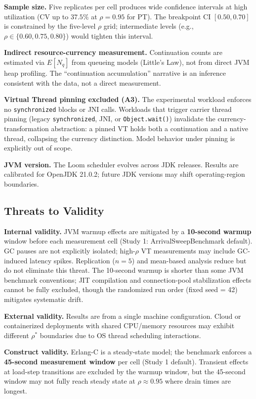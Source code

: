 \documentclass[10pt]{article}
\begin{document}
\textbf{Sample size.} Five replicates per cell produces wide confidence intervals at high utilization (CV up to $37.5\%$ at $\rho = 0.95$ for PT). The breakpoint CI $[0.50, 0.70]$ is constrained by the five-level $\rho$ grid; intermediate levels (e.g., $\rho \in \{0.60, 0.75, 0.80\}$) would tighten this interval.

\textbf{Indirect resource-currency measurement.} Continuation counts are estimated via $E[N_q]$ from queueing models (Little's Law), not from direct JVM heap profiling. The ``continuation accumulation'' narrative is an inference consistent with the data, not a direct measurement.

\textbf{Virtual Thread pinning excluded (A3).} The experimental workload enforces no \texttt{synchronized} blocks or JNI calls. Workloads that trigger carrier thread pinning (legacy \texttt{synchronized}, JNI, or \texttt{Object.wait()}) invalidate the currency-transformation abstraction: a pinned VT holds both a continuation and a native thread, collapsing the currency distinction. Model behavior under pinning is explicitly out of scope.

\textbf{JVM version.} The Loom scheduler evolves across JDK releases. Results are calibrated for OpenJDK 21.0.2; future JDK versions may shift operating-region boundaries.

\subsection{Threats to Validity}

\textbf{Internal validity.} JVM warmup effects are mitigated by a \textbf{10-second warmup} window before each measurement cell (Study 1: ArrivalSweepBenchmark default). GC pauses are not explicitly isolated; high-$\rho$ VT measurements may include GC-induced latency spikes. Replication ($n=5$) and mean-based analysis reduce but do not eliminate this threat. The 10-second warmup is shorter than some JVM benchmark conventions; JIT compilation and connection-pool stabilization effects cannot be fully excluded, though the randomized run order (fixed seed = 42) mitigates systematic drift.

\textbf{External validity.} Results are from a single machine configuration. Cloud or containerized deployments with shared CPU/memory resources may exhibit different $\rho^*$ boundaries due to OS thread scheduling interactions.

\textbf{Construct validity.} Erlang-C is a steady-state model; the benchmark enforces a \textbf{45-second measurement window} per cell (Study 1 default). Transient effects at load-step transitions are excluded by the warmup window, but the 45-second window may not fully reach steady state at $\rho \approx 0.95$ where drain times are longest.
\end{document}
